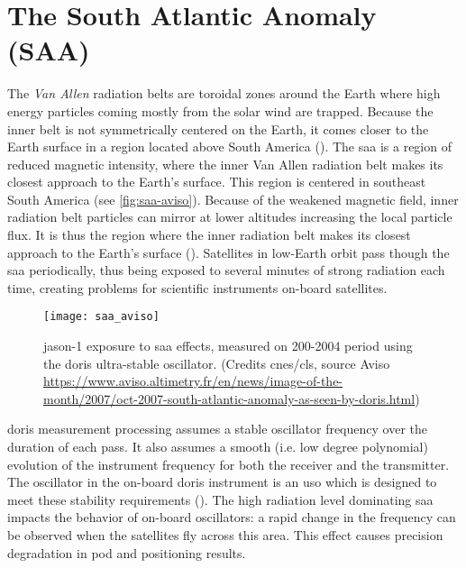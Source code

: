 \section{The South Atlantic Anomaly (SAA)}\label{sec:saa}

\iffalse
https://www.aviso.altimetry.fr/en/news/image-of-the-month/2007/oct-2007-south-atlantic-anomaly-as-seen-by-doris.html
https://ids-doris.org/images/documents/report/ids_workshop_2010/IDS10_s1_Stepanek_Spot5SAA.pdf
\fi

The \emph{Van Allen} radiation belts 
are toroidal zones around the Earth where high energy particles coming mostly 
from the solar wind are trapped. Because the inner belt is not symmetrically 
centered on the Earth, it comes closer to the Earth surface in a region 
located above South America (\cite{Jalabert2018}).
The \gls{saa} is a region of reduced magnetic intensity, where 
the inner Van Allen radiation belt makes its closest approach 
to the Earth's surface. This region is centered in southeast South America (see 
\autoref{fig:saa-aviso}). Because 
of the weakened magnetic 
field, inner radiation belt particles can mirror at lower altitudes increasing 
the local particle flux. It is thus the region where the inner radiation belt 
makes its closest approach to the Earth's surface (\cite{Anderson2018}). 
Satellites in low-Earth orbit pass though the \gls{saa} periodically, thus being 
exposed to several minutes of strong radiation each time, creating problems for 
scientific instruments on-board satellites.

\begin{figure}
  \centering
  \texttt{[image: saa\_aviso]}
  \caption{\gls{jason}-1 exposure to \gls{saa} effects, measured on 200-2004 
    period using the \gls{doris} ultra-stable oscillator. (Credits \gls{cnes}/\gls{cls}, 
    source Aviso \url{https://www.aviso.altimetry.fr/en/news/image-of-the-month/2007/oct-2007-south-atlantic-anomaly-as-seen-by-doris.html})}
  \label{fig:saa-aviso}
\end{figure}

\gls{doris} measurement processing assumes a stable oscillator frequency over 
the duration of each pass. It also assumes a smooth (i.e. low degree polynomial) 
evolution of the instrument frequency for both the receiver and the transmitter. 
The oscillator in the on-board \gls{doris} instrument is an \gls{uso} which is 
designed to meet these stability requirements (\cite{Jalabert2018}).
The high radiation level dominating \gls{saa} impacts the behavior of on-board 
oscillators: a rapid change in the frequency can be observed when the satellites 
fly across this area. This effect causes precision degradation in \gls{pod} and 
positioning results.

